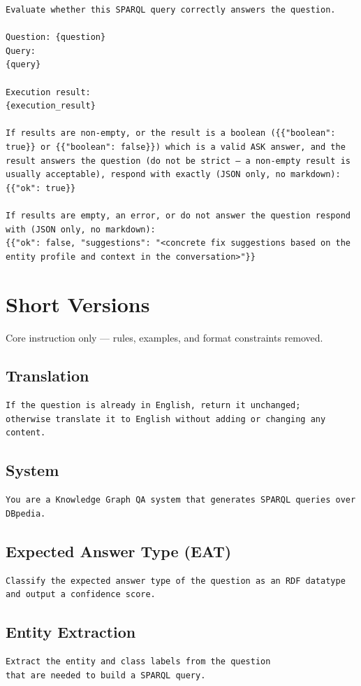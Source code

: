 \documentclass[11pt,a4paper]{article}
\begin{document}
\begin{lstlisting}[style=prompt]
Evaluate whether this SPARQL query correctly answers the question.

Question: {question}
Query:
{query}

Execution result:
{execution_result}

If results are non-empty, or the result is a boolean ({{"boolean": true}} or {{"boolean": false}}) which is a valid ASK answer, and the result answers the question (do not be strict — a non-empty result is usually acceptable), respond with exactly (JSON only, no markdown):
{{"ok": true}}

If results are empty, an error, or do not answer the question respond with (JSON only, no markdown):
{{"ok": false, "suggestions": "<concrete fix suggestions based on the entity profile and context in the conversation>"}}
\end{lstlisting}

\newpage
\section*{Short Versions}
Core instruction only --- rules, examples, and format constraints removed.

\subsection*{Translation}
\begin{lstlisting}[style=shortprompt]
If the question is already in English, return it unchanged;
otherwise translate it to English without adding or changing any content.
\end{lstlisting}
\subsection*{System}
\begin{lstlisting}[style=shortprompt]
You are a Knowledge Graph QA system that generates SPARQL queries over DBpedia.
\end{lstlisting}
\subsection*{Expected Answer Type (EAT)}
\begin{lstlisting}[style=shortprompt]
Classify the expected answer type of the question as an RDF datatype
and output a confidence score.
\end{lstlisting}
\subsection*{Entity Extraction}
\begin{lstlisting}[style=shortprompt]
Extract the entity and class labels from the question
that are needed to build a SPARQL query.
\end{lstlisting}
\end{document}
